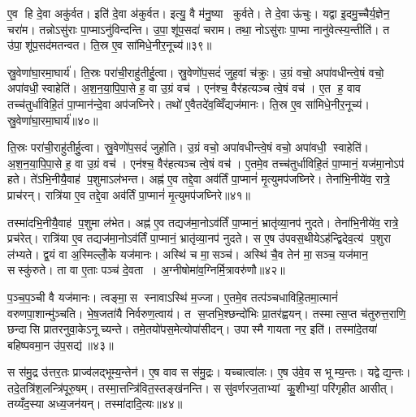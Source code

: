 ए॒व हि दे॒वा अकु॑र्वत। इति॑ दे॒वा अ॑कुर्वत। इत्यु॒ वै म॑नु॒ष्या कुर्वते। ते दे॒वा ऊ॑चुः। यद्वा इ॒दमु॒च्चैर्य॒ज्ञेन॒ चरा॑म। तन्नोऽसु॑राः पा॒प्माऽनु॑विन्दन्ति। उ॒पा॒शू॑प॒सदा॑ चराम। तथा॒ नोऽसु॑राः पा॒प्मा नानु॑वेत्स्य॒न्तीति॑। त उ॑पा॒शू॑प॒सद॑मतन्वत। ति॒स्र ए॒व सा॑मिधे॒नीर॒नूच्य॑॥३९॥

स्रु॒वेणा॑घा॒रमा॒घार्य॑। ति॒स्रः परा॑ची॒राहु॑तीर्\mbox{}हु॒त्वा। स्रु॒वेणो॑प॒सदं॑ जुह॒वां च॑क्रुः। उ॒ग्रं वचो॒ अपा॑वधीन्त्वे॒षं वचो॒ अपा॑वधी॒स्वाहेति॑। अ॒श॒न॒या॒पि॒पा॒से ह॒ वा उ॒ग्रं वच॑। एन॑श्च॒ वैर॑हत्यञ्च त्वे॒षं वच॑। ए॒त ह॒ वाव तच्च॑तुर्धाविहि॒तं पा॒प्मान॑न्दे॒वा अप॑जघ्निरे। तथो॑ ए॒वैतदे॑व॒व्विँद्यज॑मानः। ति॒स्र ए॒व सा॑मिधे॒नीर॒नूच्य॑। स्रु॒वेणा॑घा॒रमा॒घार्य॑॥४०॥

ति॒स्रः परा॑ची॒राहु॑तीर्\mbox{}हु॒त्वा। स्रु॒वेणो॑प॒सदं॑ जुहोति। उ॒ग्रं वचो॒ अपा॑वधीन्त्वे॒षं वचो॒ अपा॑वधी॒ स्वाहेति॑। अ॒श॒न॒या॒पि॒पा॒से ह॒ वा उ॒ग्रं वच॑। एन॑श्च॒ वैर॑हत्यञ्च त्वे॒षं वच॑। ए॒तमे॒व तच्च॑तुर्धाविहि॒तं पा॒प्मानं॒ यज॑मा॒नोऽप॑ हते। ते॑ऽभि॒नीयै॒वाह॑ प॒शुमाऽल॑भन्त। अह्न॑ ए॒व तद्दे॒वा अव॑र्तिं पा॒प्मानं॑ मृ॒त्युमप॑जघ्निरे। तेना॑भि॒नीये॑व॒ रात्रे॒ प्राच॑रन्। रात्रि॑या ए॒व तद्दे॒वा अव॑र्तिं पा॒प्मानं॑ मृ॒त्युमप॑जघ्निरे॥४१॥

तस्मा॑दभि॒नीयै॒वाह॑ प॒शुमा ल॑भेत। अह्न॑ ए॒व तद्यज॑मा॒नोऽव॑र्तिं पा॒प्मानं॒ भ्रातृ॑व्या॒नप॑ नुदते। तेना॑भि॒नीये॑व॒ रात्रे॒ प्रच॑रेत्। रात्रि॑या ए॒व तद्यज॑मा॒नोऽव॑र्तिं पा॒प्मानं॒ भ्रातृ॑व्या॒नप॑ नुदते। स ए॒ष उ॑पवस॒थीयेऽह॑न्द्विदेव॒त्य॑ प॒शुरा ल॑भ्यते। द्व॒यं वा अ॒स्मिल्लोँ॒के यज॑मानः। अस्थि॑ च मा॒सञ्च॑। अस्थि॑ चै॒व तेन॑ मा॒सञ्च॒ यज॑मान॒ सस्कु॑रुते। ता वा ए॒ताः पञ्च॑ दे॒वता। अ॒ग्नीषोमा॑व॒ग्निर्मि॒त्रावरु॑णौ॥४२॥

प॒ञ्च॒प॒ञ्ची वै यज॑मानः। त्वङ्मा॒स स्नावाऽस्थि॑ म॒ज्जा। ए॒तमे॒व तत्प॑ञ्चधाविहि॒तमा॒त्मानं॑ वरुणपा॒शान्मु॑ञ्चति। भे॒ष॒जता॑यै निर्वरुण॒त्वाय॑। त स॒प्तभि॒श्छन्दो॑भिः प्रा॒तर॑ह्वयन्। तस्मात्स॒प्त च॑तुरुत्त॒राणि॒ छन्दासि प्रातरनुवा॒केऽनूच्यन्ते। तमे॒तयो॑पस॒मेत्योपा॑सीदन्। उपास्मै गायता नर॒ इति॑। तस्मा॑दे॒तया॑ बहिष्पवमा॒न उ॑प॒सद्य॑॥४३॥\anuvakamend[ऐ॒च्छ॒न्न॒न॒य॒स्ति॒ष्ठ॒न्ते॒ऽनूच्या॒नूच्य॑ स्रु॒वेणा॑घा॒रमा॒घार्य॒ रात्रि॑या ए॒व तद्दे॒वा अव॑र्तिं पा॒प्मानं॑ मृ॒त्युमप॑जिघ्निरे मि॒त्रावरु॑णौ॒ नव॑ च (दे॒वा यज॑मानो दे॒वा दे॒वा यज॑मानो॒ यज॑मानोऽलभन्त॒ प्राच॑रल्लँभेत॒ प्रच॑रे॒दाल॑भ॒न्ताल॑भेत मृ॒त्युमप॑जघ्निरे॒ भ्रातृ॑व्यान्॥)]

स स॑मु॒द्र उ॑त्तर॒तः प्राज्व॑लद्भूम्य॒न्तेन॑। ए॒ष वाव स स॑मु॒द्रः। यच्चात्वा॑लः। ए॒ष उ॑वे॒व स भूम्य॒न्तः। यद्वेद्य॒न्तः। तदे॒तत्रि॑श॒लन्त्रि॑पूरु॒षम्। तस्मा॒त्तन्त्रि॑वित॒स्तङ्ख॑नन्ति। स सु॑वर्णरज॒ताभ्यां कु॒शीभ्यां॒ परि॑गृहीत आसीत्। तय्यँद॒स्या अध्य॒जन॑यन्। तस्मा॑दादि॒त्यः॥४४॥

